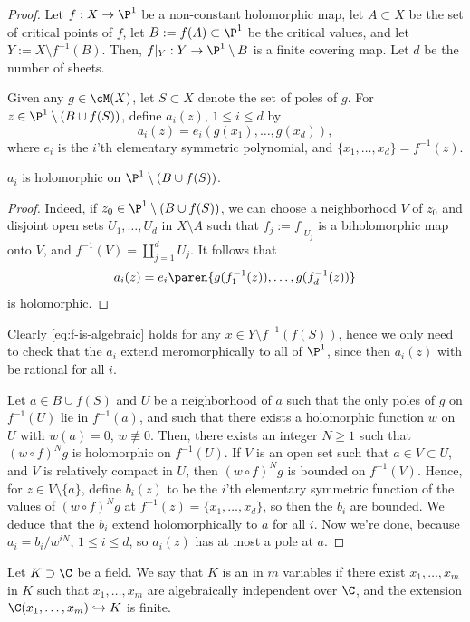 \documentclass[11pt]{report}
\begin{document}
\begin{proof}
Let $f:X \to \P^1$ be a non-constant holomorphic map, let $A \subset X$ be the set of critical points of $f$, let $B:=f(A) \subset \P^1$ be the critical values, and let $Y:=X \setminus f^{-1}(B)$. Then, $f|_Y:Y \to \P^1\setminus B$ is a finite covering map. Let $d$ be the number of sheets.

Given any $g \in \cM (X)$, let $S\subset X$ denote the set of poles of $g$. For $z \in \P^1\setminus (B \cup f(S))$, define $a_i(z)$, $1\leq i \leq d$ by
\[
a_i(z)=e_i(g(x_1),\dots,g(x_d)),
\]
where $e_i$ is the $i$'th elementary symmetric polynomial, and $\{x_1,\dots,x_d\}=f^{-1}(z)$.

\begin{claim}
$a_i$ is holomorphic on $\P^1\setminus (B \cup f(S))$.
\end{claim}
\begin{proof}
Indeed, if $z_0 \in \P^1\setminus (B \cup f(S))$, we can choose a neighborhood $V$ of $z_0$ and disjoint open sets $U_1,\dots,U_d$ in $X \setminus A$ such that $f_j:=f|_{U_j}$ is a biholomorphic map onto $V$, and $f^{-1}(V)=\coprod_{j=1}^dU_j$. It follows that
\[
a_i(z)= e_i\paren{g (f_1^{-1}(z)),\dots, g(f_d^{-1}(z))}
\]
is holomorphic.
\end{proof}
Clearly \eqref{eq:f-is-algebraic} holds for any $x \in Y \setminus f^{-1} (f(S))$, hence we only need to check that the $a_i$ extend meromorphically to all of $\P^1$, since then $a_i(z)$ with be rational for all $i$.

Let $a \in B \cup f(S)$ and $U$ be a neighborhood of $a$ such that the only poles of $g$ on $f^{-1}(U)$ lie in $f^{-1}(a)$, and such that there exists a holomorphic function $w$ on $U$ with $w(a)=0$, $w \not \equiv 0$. Then, there exists an integer $N \geq 1$ such that $(w \circ f)^Ng$ is holomorphic on $f^{-1}(U)$. If $V$ is an open set such that $a \in V \subset U$, and $V$ is relatively compact in $U$, then $(w \circ f)^Ng$ is bounded on $f^{-1}(V)$. Hence, for $z \in V\setminus \{a\}$, define $b_i(z)$ to be the $i$'th elementary symmetric function of the values of $(w \circ f)^Ng$ at $f^{-1}(z)=\{x_1,\dots,x_d\}$, so then the $b_i$ are bounded. We deduce that the $b_i$ extend holomorphically to $a$ for all $i$. Now we're done, because $a_i=b_i/w^{iN}$, $1 \leq i \leq d$, so $a_i(z)$ has at most a pole at $a$.
\end{proof}

\begin{defn}
Let $K\supset \C$ be a field. We say that $K$ is an  in $m$ variables if there exist $x_1,\dots,x_m$ in $K$ such that $x_1,\dots,x_m$ are algebraically independent over $\C$, and the extension $\C(x_1,\dots,x_m)\hookrightarrow K$ is finite.
\end{defn}
\end{document}
